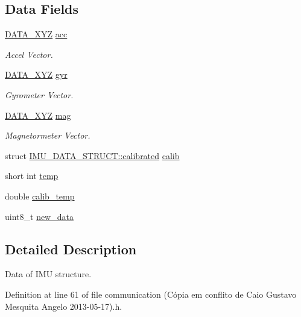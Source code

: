 \subsection*{Data Fields}
\begin{DoxyCompactItemize}
\item 
\hyperlink{structDATA__XYZ}{D\-A\-T\-A\-\_\-\-X\-Y\-Z} \hyperlink{structIMU__DATA__STRUCT_a448f284bf44eb503affda586ad5fa9d2}{acc}
\begin{DoxyCompactList}\small\item\em Accel Vector. \end{DoxyCompactList}\item 
\hyperlink{structDATA__XYZ}{D\-A\-T\-A\-\_\-\-X\-Y\-Z} \hyperlink{structIMU__DATA__STRUCT_a0c1ac26626e4434a2ee124a1928a23a1}{gyr}
\begin{DoxyCompactList}\small\item\em Gyrometer Vector. \end{DoxyCompactList}\item 
\hyperlink{structDATA__XYZ}{D\-A\-T\-A\-\_\-\-X\-Y\-Z} \hyperlink{structIMU__DATA__STRUCT_a40c7df8b6d49297aa52873cfd9b60daa}{mag}
\begin{DoxyCompactList}\small\item\em Magnetormeter Vector. \end{DoxyCompactList}\item 
struct \hyperlink{structIMU__DATA__STRUCT_1_1calibrated}{I\-M\-U\-\_\-\-D\-A\-T\-A\-\_\-\-S\-T\-R\-U\-C\-T\-::calibrated} \hyperlink{structIMU__DATA__STRUCT_aeffe3c3c5a7191a5cef16e7aab6c3795}{calib}
\item 
short int \hyperlink{structIMU__DATA__STRUCT_a81e1dbf765c1d947ca6076aa1bbc73e7}{temp}
\item 
double \hyperlink{structIMU__DATA__STRUCT_a3553fcee6beba17fe0c7711ac0483875}{calib\-\_\-temp}
\item 
uint8\-\_\-t \hyperlink{structIMU__DATA__STRUCT_a99924252176326418863e511d4fa437b}{new\-\_\-data}
\end{DoxyCompactItemize}


\subsection{Detailed Description}
Data of I\-M\-U structure. 

Definition at line 61 of file communication (\-Cópia em conflito de Caio Gustavo Mesquita Angelo 2013-\/05-\/17).\-h.



